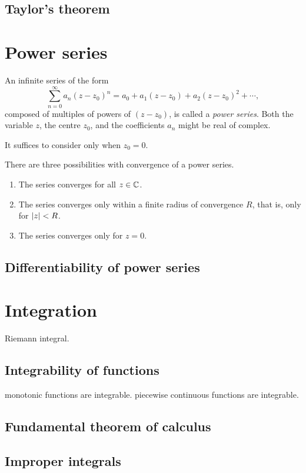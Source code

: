 \documentclass[main.tex]{subfiles}
\begin{document}
	\subsection{Taylor's theorem}
	
	\section{Power series}
	\begin{definition}
		An infinite series of the form
		\begin{equation*}
		\sum_{n = 0}^{\infty} a_n(z - z_0)^n = a_0 + a_1 (z - z_0) + a_2 (z - z_0)^2 + \cdots,
		\end{equation*}
		composed of multiples of powers of $(z - z_0)$, is called a \textit{power series}. Both the variable $z$, the centre $z_0$, and the coefficients $a_n$ might be real of complex.
		
		It suffices to consider only when $z_0 = 0$.
	\end{definition}
	There are three possibilities with convergence of a power series.
	\begin{enumerate}
		\item The series converges for all $z \in \mathbb C$.
		\item The series converges only within a finite radius of convergence $R$, that is, only for $\lvert z\rvert < R$.
		\item The series converges only for $z = 0$.
	\end{enumerate}
	\subsection{Differentiability of power series}
	
	\section{Integration}
	Riemann integral.
	\subsection{Integrability of functions}
	monotonic functions are integrable. 
	piecewise continuous functions are integrable.
	\subsection{Fundamental theorem of calculus}
	\subsection{Improper integrals}
\end{document}
